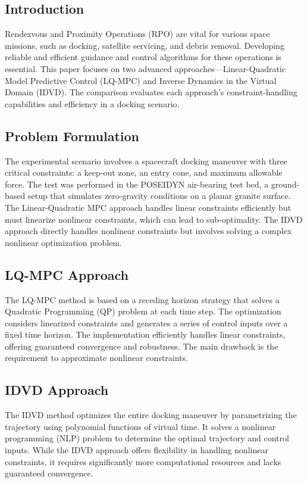 \documentclass[a4paper,12pt]{article}
\begin{document}
\subsection{Introduction}
Rendezvous and Proximity Operations (RPO) are vital for various space missions, such as docking, satellite servicing, and debris removal. Developing reliable and efficient guidance and control algorithms for these operations is essential. This paper focuses on two advanced approaches—Linear-Quadratic Model Predictive Control (LQ-MPC) and Inverse Dynamics in the Virtual Domain (IDVD). The comparison evaluates each approach's constraint-handling capabilities and efficiency in a docking scenario.

\subsection{Problem Formulation}
The experimental scenario involves a spacecraft docking maneuver with three critical constraints: a keep-out zone, an entry cone, and maximum allowable force. The test was performed in the POSEIDYN air-bearing test bed, a ground-based setup that simulates zero-gravity conditions on a planar granite surface. The Linear-Quadratic MPC approach handles linear constraints efficiently but must linearize nonlinear constraints, which can lead to sub-optimality. The IDVD approach directly handles nonlinear constraints but involves solving a complex nonlinear optimization problem.

\subsection{LQ-MPC Approach}
The LQ-MPC method is based on a receding horizon strategy that solves a Quadratic Programming (QP) problem at each time step. The optimization considers linearized constraints and generates a series of control inputs over a fixed time horizon. The implementation efficiently handles linear constraints, offering guaranteed convergence and robustness. The main drawback is the requirement to approximate nonlinear constraints.

\subsection{IDVD Approach}
The IDVD method optimizes the entire docking maneuver by parametrizing the trajectory using polynomial functions of virtual time. It solves a nonlinear programming (NLP) problem to determine the optimal trajectory and control inputs. While the IDVD approach offers flexibility in handling nonlinear constraints, it requires significantly more computational resources and lacks guaranteed convergence.
\end{document}
